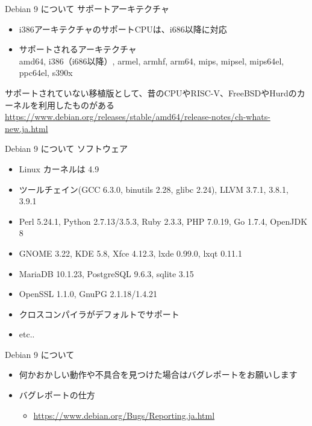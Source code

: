 \documentclass[cjk,dvipdfmx,10pt,compress,%
hyperref={bookmarks=true,bookmarksnumbered=true,bookmarksopen=false,%
colorlinks=false,%
pdftitle={第 132 回 関西 Debian 勉強会},%
pdfauthor={かわだ},%
pdfsubject={資料},%
}]{beamer}
\begin{document}
\begin{frame}{Debian 9 について}%
サポートアーキテクチャ
\begin{itemize}
\item i386アーキテクチャのサポートCPUは、i686以降に対応
\item サポートされるアーキテクチャ \\
  amd64, i386（i686以降）, armel, armhf, arm64, mips, mipsel, mips64el, ppc64el, s390x
\end{itemize}
サポートされていない移植版として、昔のCPUやRISC-V、FreeBSDやHurdのカーネルを利用したものがある
\small{\url{https://www.debian.org/releases/stable/amd64/release-notes/ch-whats-new.ja.html}}
\end{frame}

\begin{frame}{Debian 9 について}%
ソフトウェア
\begin{itemize}
\item Linux カーネルは 4.9
\item ツールチェイン(GCC 6.3.0, binutils 2.28, glibc 2.24), LLVM 3.7.1, 3.8.1, 3.9.1
\item Perl 5.24.1, Python 2.7.13/3.5.3, Ruby 2.3.3, PHP 7.0.19, Go 1.7.4, OpenJDK 8
\item GNOME 3.22, KDE 5.8, Xfce 4.12.3, lxde 0.99.0, lxqt 0.11.1
\item MariaDB 10.1.23, PostgreSQL 9.6.3, sqlite 3.15
\item OpenSSL 1.1.0, GnuPG 2.1.18/1.4.21
\item クロスコンパイラがデフォルトでサポート
\item etc..
\end{itemize}
\end{frame}

\begin{frame}{Debian 9 について}%
  \begin{itemize}
  \item 何かおかしい動作や不具合を見つけた場合はバグレポートをお願いします
  \item バグレポートの仕方
    \begin{itemize}
    \item \url{https://www.debian.org/Bugs/Reporting.ja.html}
    \end{itemize}
  \end{itemize}
\end{frame}
\end{document}
